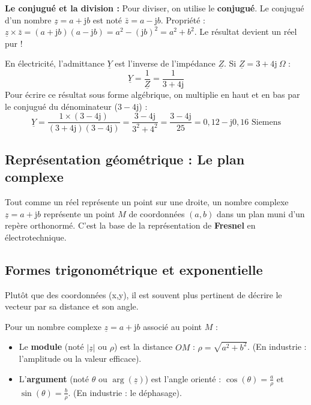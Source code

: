 \documentclass[11pt,a4paper]{article}
\newcommand{\jc}{\mathrm{j}} %
\newcommand{\cpx}[1]{\underline{#1}} %
\begin{document}
\textbf{Le conjugué et la division :}
Pour diviser, on utilise le \textbf{conjugué}. Le conjugué d'un nombre $\cpx{z} = a + \jc b$ est noté $\bar{z} = a - \jc b$.
Propriété : $\cpx{z} \times \bar{z} = (a + \jc b)(a - \jc b) = a^2 - (\jc b)^2 = a^2 + b^2$. Le résultat devient un réel pur !

\begin{exemple}
En électricité, l'admittance $\cpx{Y}$ est l'inverse de l'impédance $\cpx{Z}$. Si $\cpx{Z} = 3 + 4\jc\ \Omega$ :
$$\cpx{Y} = \frac{1}{\cpx{Z}} = \frac{1}{3 + 4\jc}$$
Pour écrire ce résultat sous forme algébrique, on multiplie en haut et en bas par le conjugué du dénominateur ($3 - 4\jc$) :
$$\cpx{Y} = \frac{1 \times (3 - 4\jc)}{(3 + 4\jc)(3 - 4\jc)} = \frac{3 - 4\jc}{3^2 + 4^2} = \frac{3 - 4\jc}{25} = 0,12 - \jc 0,16 \text{ Siemens}$$
\end{exemple}

\subsection{Représentation géométrique : Le plan complexe}
Tout comme un réel représente un point sur une droite, un nombre complexe $\cpx{z} = a + \jc b$ représente un point $M$ de coordonnées $(a, b)$ dans un plan muni d'un repère orthonormé. C'est la base de la représentation de \textbf{Fresnel} en électrotechnique.

\begin{center}
\end{center}

\subsection{Formes trigonométrique et exponentielle}
Plutôt que des coordonnées (x,y), il est souvent plus pertinent de décrire le vecteur par sa distance et son angle.

\begin{vocabulaire}
Pour un nombre complexe $\cpx{z} = a + \jc b$ associé au point $M$ :
\begin{itemize}
    \item Le \textbf{module} (noté $|\cpx{z}|$ ou $\rho$) est la distance $OM$ : $\rho = \sqrt{a^2 + b^2}$. (En industrie : l'amplitude ou la valeur efficace).
    \item L'\textbf{argument} (noté $\theta$ ou $\arg(\cpx{z})$) est l'angle orienté : $\cos(\theta) = \frac{a}{\rho}$ et $\sin(\theta) = \frac{b}{\rho}$. (En industrie : le déphasage).
\end{itemize}
\end{vocabulaire}
\end{document}
